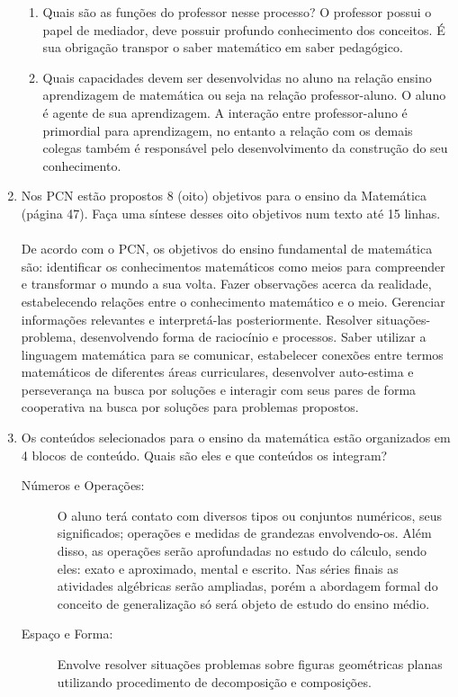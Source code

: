 \documentclass[a4paper, 12pt]{article}
\begin{document}
\begin{enumerate}
  \begin{enumerate}
  \item Quais são as funções do professor nesse processo?
    O professor possui o papel de mediador, deve possuir profundo conhecimento dos conceitos. É sua obrigação transpor o saber matemático em saber pedagógico.
   \item Quais capacidades devem ser desenvolvidas no aluno na relação ensino aprendizagem de matemática ou seja na relação professor-aluno. 
    O aluno é agente de sua aprendizagem. A interação entre professor-aluno é primordial para aprendizagem, no entanto a relação com os demais colegas também é responsável pelo desenvolvimento da construção do seu conhecimento.
  \end{enumerate}
\item Nos PCN estão propostos 8 (oito) objetivos para o ensino da Matemática (página 47). Faça uma síntese desses oito objetivos num texto até 15 linhas. \\ \\
 De acordo com o PCN, os objetivos do ensino fundamental de matemática são: identificar os conhecimentos matemáticos como meios para compreender e transformar o mundo a sua volta. Fazer observações acerca da realidade, estabelecendo relações entre o conhecimento matemático e o meio. Gerenciar informações relevantes e interpretá-las posteriormente. Resolver situações-problema, desenvolvendo forma de raciocínio e processos. Saber utilizar a linguagem matemática para se comunicar, estabelecer conexões entre termos matemáticos de diferentes áreas curriculares, desenvolver auto-estima e perseverança na busca por soluções e interagir com seus pares de forma cooperativa na busca por soluções para problemas propostos.
 \item Os conteúdos selecionados para o ensino da matemática estão organizados em 4 blocos de conteúdo. Quais são eles e que conteúdos os integram? 
   \begin{description}
   \item[Números e Operações:] O aluno terá contato com diversos tipos ou conjuntos numéricos, seus significados; operações e medidas de grandezas envolvendo-os. Além disso, as operações serão aprofundadas no estudo do cálculo, sendo eles: exato e aproximado, mental e escrito. Nas séries finais as atividades algébricas serão ampliadas, porém a abordagem formal do conceito de generalização só será objeto de estudo do ensino médio.
   \item[Espaço e Forma:] Envolve resolver situações problemas sobre figuras geométricas planas utilizando procedimento de decomposição e composições.

\end{description}
\end{enumerate}
\end{document}
